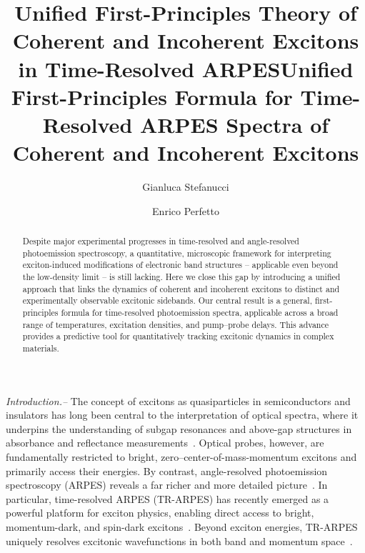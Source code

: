 \documentclass[twocolumn,aps,a4paper,superscriptaddress]{revtex4-2}
\begin{document}
\title{Unified First-Principles Theory of Coherent and Incoherent Excitons in Time-Resolved ARPES}
\title{Unified First-Principles Formula for Time-Resolved ARPES
Spectra of Coherent and Incoherent Excitons}
\author{Gianluca Stefanucci}

\author{Enrico Perfetto}




\begin{abstract}
Despite major experimental progresses in time-resolved
and angle-resolved photoemission spectroscopy, a  quantitative,
microscopic framework for interpreting
exciton-induced modifications of electronic band structures --
applicable even beyond the low-density limit -- is still lacking.
Here we close this gap by introducing a unified
approach that links the dynamics of
coherent and incoherent excitons to distinct and experimentally observable
excitonic sidebands.
Our central result is a general, first-principles
formula for time-resolved photoemission spectra, applicable across a
broad range of temperatures, excitation densities, and pump–probe
delays. This advance provides a predictive tool for
quantitatively tracking excitonic dynamics in complex
materials.
\end{abstract}

\maketitle




{\em Introduction.--}
The concept of excitons as quasiparticles in semiconductors and
insulators has long been central to the interpretation of optical
spectra, where it underpins the understanding of subgap resonances
and above-gap structures in absorbance and reflectance
measurements~\cite{onida_electronic_2002}. Optical probes, however,
are fundamentally restricted to bright, zero–center-of-mass-momentum
excitons and primarily access their energies. By contrast,
angle-resolved photoemission spectroscopy (ARPES) reveals
a far
richer and more detailed
picture~\cite{zhang_angle-resolved_2022,boschini_time-resolved_2024,xu_time-domain_2025}.
In particular, time-resolved ARPES (TR-ARPES)
has recently
emerged as a powerful platform for exciton physics, enabling  direct access
to bright, momentum-dark, and spin-dark
excitons~\cite{madeo_directly_2020,dendzik_observation_2020,tanimura_time_2020,wallauer_momentum-resolved_2021,fukutani_detecting_2021,kunin_momentum-resolved_2023,bange_probing_2024,gosetti_unveiling_2024}.
Beyond exciton energies, TR-ARPES uniquely resolves excitonic
wavefunctions in both band and momentum
space~\cite{man_experimental_2021,dong_direct_2021,meneghini_hybrid_2023,mori_spin-polarized_2023}.
\end{document}
